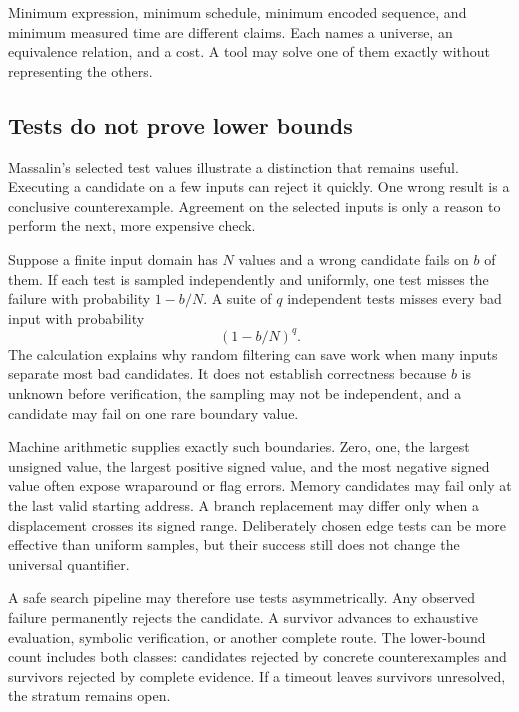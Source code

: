 \begin{archive}[title={The noun after minimum matters}]
Minimum expression, minimum schedule, minimum encoded sequence, and minimum
measured time are different claims. Each names a universe, an equivalence
relation, and a cost. A tool may solve one of them exactly without representing
the others.
\end{archive}

\subsection{Tests do not prove lower bounds}

Massalin's selected test values illustrate a distinction that remains useful.
Executing a candidate on a few inputs can reject it quickly. One wrong result
is a conclusive counterexample. Agreement on the selected inputs is only a
reason to perform the next, more expensive check.

Suppose a finite input domain has \(N\) values and a wrong candidate fails on
\(b\) of them. If each test is sampled independently and uniformly, one test
misses the failure with probability \(1-b/N\). A suite of \(q\) independent
tests misses every bad input with probability
\[
  (1-b/N)^q.
\]
The calculation explains why random filtering can save work when many inputs
separate most bad candidates. It does not establish correctness because \(b\)
is unknown before verification, the sampling may not be independent, and a
candidate may fail on one rare boundary value.

Machine arithmetic supplies exactly such boundaries. Zero, one, the largest
unsigned value, the largest positive signed value, and the most negative
signed value often expose wraparound or flag errors. Memory candidates may
fail only at the last valid starting address. A branch replacement may differ
only when a displacement crosses its signed range. Deliberately chosen edge
tests can be more effective than uniform samples, but their success still
does not change the universal quantifier.

A safe search pipeline may therefore use tests asymmetrically. Any observed
failure permanently rejects the candidate. A survivor advances to exhaustive
evaluation, symbolic verification, or another complete route. The lower-bound
count includes both classes: candidates rejected by concrete counterexamples
and survivors rejected by complete evidence. If a timeout leaves survivors
unresolved, the stratum remains open.

